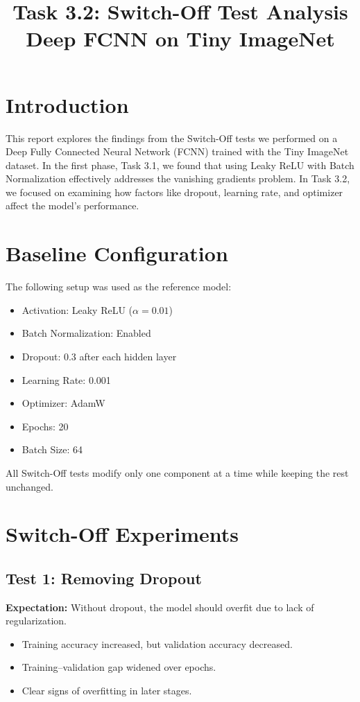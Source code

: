 \documentclass{article}
\title{Task 3.2: Switch-Off Test Analysis\\Deep FCNN on Tiny ImageNet}
\begin{document}
\maketitle

\section{Introduction}
This report explores the findings from the Switch-Off tests we performed on a Deep Fully Connected Neural Network (FCNN) trained with the Tiny ImageNet dataset. In the first phase, Task 3.1, we found that using Leaky ReLU with Batch Normalization effectively addresses the vanishing gradients problem. In Task 3.2, we focused on examining how factors like dropout, learning rate, and optimizer affect the model's performance.
 

\section{Baseline Configuration}
The following setup was used as the reference model:

\begin{itemize}
    \item Activation: Leaky ReLU ($\alpha = 0.01$)
    \item Batch Normalization: Enabled
    \item Dropout: 0.3 after each hidden layer
    \item Learning Rate: 0.001
    \item Optimizer: AdamW  
    \item Epochs: 20
    \item Batch Size: 64
\end{itemize}

All Switch-Off tests modify only one component at a time while keeping the rest unchanged.

\section{Switch-Off Experiments}

\subsection{Test 1: Removing Dropout} 

\textbf{Expectation:} Without dropout, the model should overfit due to lack of regularization.
 
\begin{itemize}
    \item Training accuracy increased, but validation accuracy decreased.
    \item Training–validation gap widened over epochs.
    \item Clear signs of overfitting in later stages.
\end{itemize}
\end{document}
